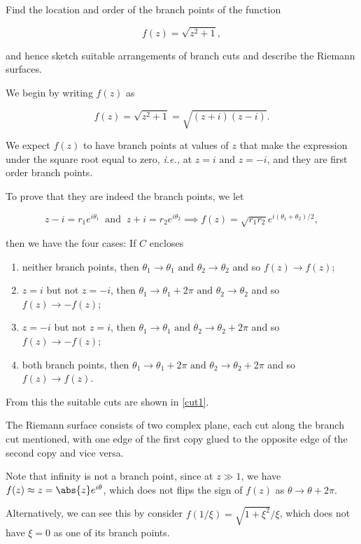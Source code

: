 \documentclass[english,a4paper,12pt]{report}
\begin{document}
{Find the location and order of the branch points of the function

\begin{equation}
    f(z) = \sqrt{z^2+1}, 
\end{equation}

and hence sketch suitable arrangements of branch cuts and describe the Riemann surfaces.}
{We begin by writing \(f(z)\) as 

\begin{equation}
    f(z) = \sqrt{z^2+1} = \sqrt{(z+i)(z-i)}.  
\end{equation}

We expect \(f(z)\) to have branch points at values of \(z\) that make the expression under the square root equal to zero, \textit{i.e.,} at \(z = i \text { and } z = -i\), and they are first order branch points.

To prove that they are indeed the branch points, we let 

\begin{equation}
    z - i  = r_1 e^{i \theta _{1} } ~\text { and }~ z+i = r_2 e^{i \theta _{2} } \implies f(z) = \sqrt{r_1 r_2 } e^{i(\theta _{1}+\theta _{2}  ) /2},     
\end{equation}

then we have the four cases: If \(C\) encloses

\begin{enumerate}
    \item neither branch points, then \(\theta _{1} \to \theta _{1} \text { and } \theta _{2}\to \theta _{2}    \) and so \(f(z) \to f(z)\);
    \item \(z = i\) but not \(z = -i\), then \(\theta _{1} \to \theta _{1}+2\pi   \text { and } \theta _{2} \to \theta _{2}  \) and so \(f(z) \to -f(z)\);
    \item \(z = -i\) but not \(z = i\), then \(\theta _{1} \to \theta _{1} \text { and } \theta _{2} \to \theta _{2} + 2\pi     \) and so \(f(z) \to -f(z)\); 
    \item both branch points, then \(\theta _{1} \to \theta _{1} + 2\pi   \text { and } \theta _{2} \to \theta _{2} + 2\pi   \) and so \(f(z) \to f(z)\).
\end{enumerate}

From this the suitable cuts are shown in \cref{cut1}.

The Riemann surface consists of two complex plane, each cut along the branch cut mentioned, with one edge of the first copy glued to the opposite edge of the second copy and vice versa.

Note that infinity is not a branch point, since at \(z \gg 1\), we have \(f(z) \approx z = \abs{z}e^{i \theta }  \), which does not flips the sign of \(f(z)\) as \(\theta  \to \theta + 2\pi \). 

Alternatively, we can see this by consider \(f(1 /\xi )= \sqrt{1+\xi ^2} /\xi  \), which does not have \(\xi = 0\) as one of its branch points. 
} 
\end{document}
